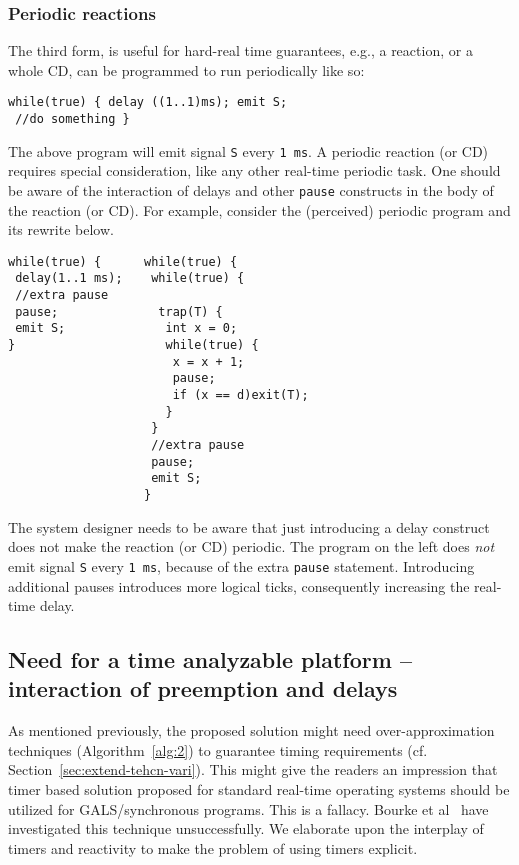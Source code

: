 \subsubsection{Periodic reactions}
\label{sec:periodic-reactions}

The third form, is useful for hard-real time guarantees, e.g., a
reaction, or a whole CD, can be programmed to run periodically like so:

\begin{verbatim}
while(true) { delay ((1..1)ms); emit S; 
 //do something }
\end{verbatim}

The above program will emit signal \texttt{S} every \texttt{1 ms}. A
periodic reaction (or CD) requires special consideration, like any other
real-time periodic task. One should be aware of the interaction of
delays and other \texttt{pause} constructs in the body of the reaction
(or CD). For example, consider the (perceived) periodic program and its
rewrite below.

\begin{verbatim}
while(true) {      while(true) {
 delay(1..1 ms);    while(true) { 
 //extra pause
 pause;              trap(T) {
 emit S;              int x = 0;
}                     while(true) {
                       x = x + 1;
                       pause;
                       if (x == d)exit(T);
                      }
                    }
                    //extra pause
                    pause;
                    emit S;
                   }
\end{verbatim}

The system designer needs to be aware that just introducing a delay
construct does not make the reaction (or CD) periodic. The program on
the left does \textit{not} emit signal \texttt{S} every \texttt{1 ms},
because of the extra \texttt{pause} statement. Introducing additional
pauses introduces more logical ticks, consequently increasing the
real-time delay.

\subsection{Need for a time analyzable platform -- interaction of
  preemption and delays}
\label{sec:inter-preempt-delays}

As mentioned previously, the proposed solution might need
over-approximation techniques (Algorithm~\ref{alg:2}) to guarantee
timing requirements (cf. Section~\ref{sec:extend-tehcn-vari}). This
might give the readers an impression that timer based solution proposed
for standard real-time operating systems should be utilized for
GALS/synchronous programs. This is a fallacy. Bourke et
al~\cite{Bourke2009a} have investigated this technique
unsuccessfully. We elaborate upon the interplay of timers and reactivity
to make the problem of using timers explicit.

